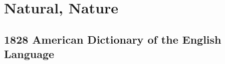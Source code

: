 \section{Natural, Nature}
	\label{NATURAL}
	

\subsection{1828 American Dictionary of the English Language} %
	\label{NATURAL-1828}

